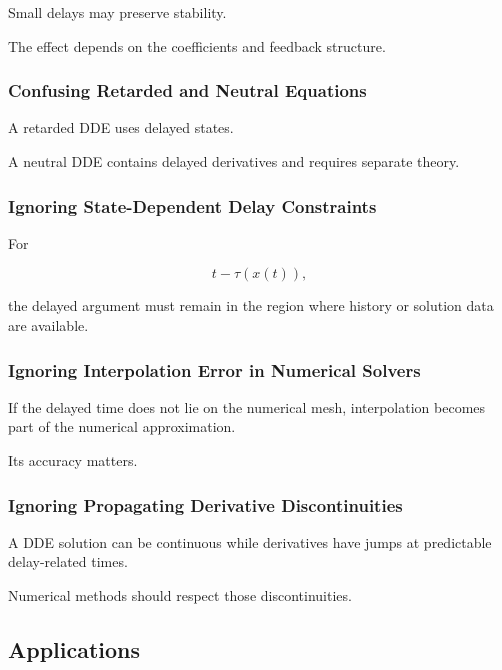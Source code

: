 Small delays may preserve stability.

The effect depends on the coefficients and feedback structure.

\subsubsection{Confusing Retarded and Neutral Equations}

A retarded DDE uses delayed states.

A neutral DDE contains delayed derivatives and requires separate theory.

\subsubsection{Ignoring State-Dependent Delay Constraints}

For

\[
t-\tau(x(t)),
\]

the delayed argument must remain in the region where history or solution
data are available.

\subsubsection{Ignoring Interpolation Error in Numerical Solvers}

If the delayed time does not lie on the numerical mesh, interpolation
becomes part of the numerical approximation.

Its accuracy matters.

\subsubsection{Ignoring Propagating Derivative Discontinuities}

A DDE solution can be continuous while derivatives have jumps at
predictable delay-related times.

Numerical methods should respect those discontinuities.

\subsection{Applications}
\label{subsec:dde-applications}


